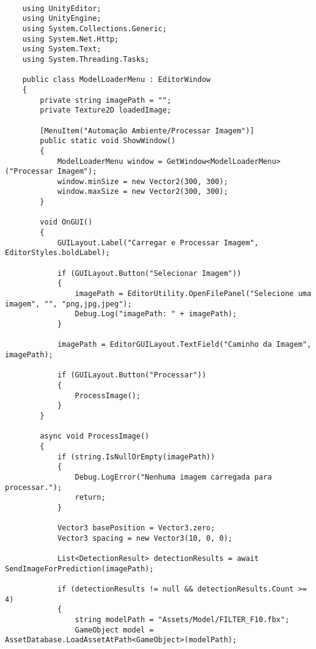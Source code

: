 \begin{lstlisting}

    using UnityEditor;
    using UnityEngine;
    using System.Collections.Generic;
    using System.Net.Http;
    using System.Text;
    using System.Threading.Tasks;
    
    public class ModelLoaderMenu : EditorWindow
    {
        private string imagePath = "";
        private Texture2D loadedImage;
    
        [MenuItem("Automação Ambiente/Processar Imagem")]
        public static void ShowWindow()
        {
            ModelLoaderMenu window = GetWindow<ModelLoaderMenu>("Processar Imagem");
            window.minSize = new Vector2(300, 300);
            window.maxSize = new Vector2(300, 300);
        }
    
        void OnGUI()
        {
            GUILayout.Label("Carregar e Processar Imagem", EditorStyles.boldLabel);
    
            if (GUILayout.Button("Selecionar Imagem"))
            {
                imagePath = EditorUtility.OpenFilePanel("Selecione uma imagem", "", "png,jpg,jpeg");
                Debug.Log("imagePath: " + imagePath);
            }
    
            imagePath = EditorGUILayout.TextField("Caminho da Imagem", imagePath);
    
            if (GUILayout.Button("Processar"))
            {
                ProcessImage();
            }
        }   
    
        async void ProcessImage()
        {
            if (string.IsNullOrEmpty(imagePath))
            {
                Debug.LogError("Nenhuma imagem carregada para processar.");
                return;
            }
    
            Vector3 basePosition = Vector3.zero;
            Vector3 spacing = new Vector3(10, 0, 0); 
    
            List<DetectionResult> detectionResults = await SendImageForPrediction(imagePath);
    
            if (detectionResults != null && detectionResults.Count >= 4)
            {
                string modelPath = "Assets/Model/FILTER_F10.fbx";
                GameObject model = AssetDatabase.LoadAssetAtPath<GameObject>(modelPath);
    

\end{lstlisting}
